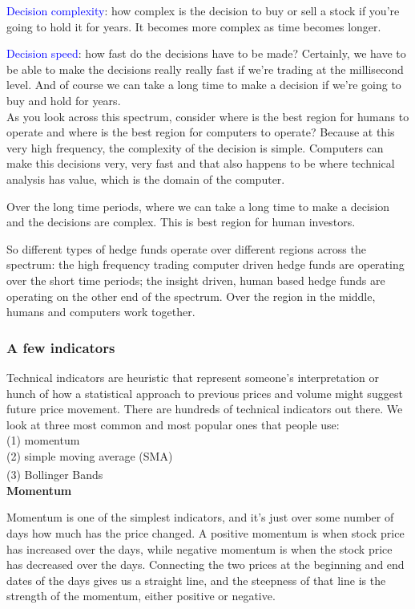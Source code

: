 \documentclass[12pt]{article}
\begin{document}
\textcolor{blue}{Decision complexity}: how complex is the decision to buy or sell a stock if you're going to hold it for years. It becomes more complex as time becomes longer. 

\textcolor{blue}{Decision speed}: how fast do the decisions have to be made? Certainly, we have to be able to make the decisions really really fast if we're trading at the millisecond level. And of course we can take a long time to make a decision if we're going to buy and hold for years. \\[8pt]
\noindent
As you look across this spectrum, consider where is the best region for humans to operate and where is the best region for computers to operate? Because at this very high frequency, the complexity of the decision is simple. Computers can make this decisions very, very fast and that also happens to be where technical analysis has value, which is the domain of the computer. 

Over the long time periods, where we can take a long time to make a decision and the decisions are complex. This is best region for human investors. 

So different types of hedge funds operate over different regions across the spectrum: the high frequency trading computer driven hedge funds are operating over the short time periods; the insight driven, human based hedge funds are operating on the other end of the spectrum. Over the region in the middle, humans and computers work together. 

\subsubsection{A few indicators}

Technical indicators are heuristic that represent someone's interpretation or hunch of how a statistical approach to previous prices and volume might suggest future price movement. There are hundreds of technical indicators out there. We look at three most common and most popular ones that people use: \\
(1) momentum \\
(2) simple moving average (SMA) \\
(3) Bollinger Bands\textsuperscript\textregistered \\[8pt]
\noindent
\textbf{Momentum} 

Momentum is one of the simplest indicators, and it's just over some number of days how much has the price changed. A positive momentum is when stock price has increased over the days, while negative momentum is when the stock price has decreased over the days. Connecting the two prices at the beginning and end dates of the days gives us a straight line, and the steepness of that line is the strength of the momentum, either positive or negative. 
\end{document}
